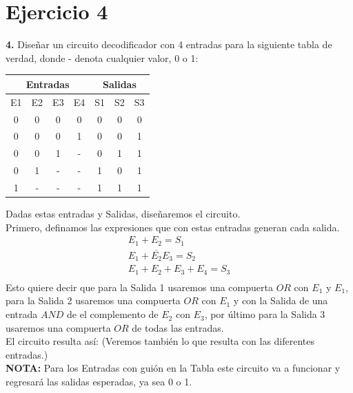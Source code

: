 \chapter*{Ejercicio 4}

\textbf{4.}  Diseñar un circuito decodificador con 4 entradas para la siguiente tabla de verdad, donde - denota cualquier valor, 0 o 1:

\begin{center}
        \begin{tabular}{|c c c c|c c c|}
        \hline
        \multicolumn{4}{|c|}{Entradas} &
        \multicolumn{3}{|c|}{Salidas} \\ \hline
        E1 & E2 & E3 & E4 & S1 & S2 & S3 \\ \hline
        0 & 0 & 0 & 0 & 0 & 0 & 0 \\ \hline
        0 & 0 & 0 & 1 & 0 & 0 & 1 \\ \hline
        0 & 0 & 1 & - & 0 & 1 & 1 \\ \hline
        0 & 1 & - & - & 1 & 0 & 1 \\ \hline
        1 & - & - & - & 1 & 1 & 1 \\ \hline
        \end{tabular}
        \label{tab:coches}
\end{center}

Dadas estas entradas y Salidas, diseñaremos el circuito. \\
Primero, definamos las expresiones que con estas entradas generan cada salida. \\
\begin{align*}
E_{1}+E_{2}=S_{1} \\
E_{1} + \overline{E_{2}}E_{3} = S_{2} \\
E_{1} + E_{2} + E_{3} +E_{4} = S_{3} \\
\end{align*}
Esto quiere decir que para la Salida 1 usaremos una compuerta $OR$ con $E_{1}$ y $E_{1}$, para la Salida 2 usaremos una compuerta $OR$ con $E_{1}$ y con la Salida de una entrada $AND$ de el complemento de $E_{2}$ con $E_{3}$, por último para la Salida 3 usaremos una compuerta $OR$ de todas las entradas. \\
\newline
El circuito resulta así: (Veremos también lo que resulta con las diferentes entradas.) \\
\textbf{NOTA:} Para los Entradas con guión en la Tabla este circuito va a funcionar y regresará las salidas esperadas, ya sea 0 o 1.

